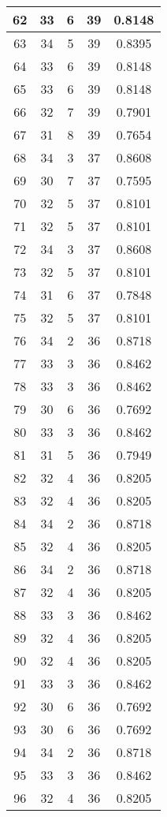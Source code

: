 \documentclass[letterpaper, 12pt]{article}
\begin{document}
\begin{longtable}{|c|c|c|c|c|}
\hline
62 & 33 & 6 & 39 & 0.8148 \\
\hline
63 & 34 & 5 & 39 & 0.8395 \\
\hline
64 & 33 & 6 & 39 & 0.8148 \\
\hline
65 & 33 & 6 & 39 & 0.8148 \\
\hline
66 & 32 & 7 & 39 & 0.7901 \\
\hline
67 & 31 & 8 & 39 & 0.7654 \\
\hline
68 & 34 & 3 & 37 & 0.8608 \\
\hline
69 & 30 & 7 & 37 & 0.7595 \\
\hline
70 & 32 & 5 & 37 & 0.8101 \\
\hline
71 & 32 & 5 & 37 & 0.8101 \\
\hline
72 & 34 & 3 & 37 & 0.8608 \\
\hline
73 & 32 & 5 & 37 & 0.8101 \\
\hline
74 & 31 & 6 & 37 & 0.7848 \\
\hline
75 & 32 & 5 & 37 & 0.8101 \\
\hline
76 & 34 & 2 & 36 & 0.8718 \\
\hline
77 & 33 & 3 & 36 & 0.8462 \\
\hline
78 & 33 & 3 & 36 & 0.8462 \\
\hline
79 & 30 & 6 & 36 & 0.7692 \\
\hline
80 & 33 & 3 & 36 & 0.8462 \\
\hline
81 & 31 & 5 & 36 & 0.7949 \\
\hline
82 & 32 & 4 & 36 & 0.8205 \\
\hline
83 & 32 & 4 & 36 & 0.8205 \\
\hline
84 & 34 & 2 & 36 & 0.8718 \\
\hline
85 & 32 & 4 & 36 & 0.8205 \\
\hline
86 & 34 & 2 & 36 & 0.8718 \\
\hline
87 & 32 & 4 & 36 & 0.8205 \\
\hline
88 & 33 & 3 & 36 & 0.8462 \\
\hline
89 & 32 & 4 & 36 & 0.8205 \\
\hline
90 & 32 & 4 & 36 & 0.8205 \\
\hline
91 & 33 & 3 & 36 & 0.8462 \\
\hline
92 & 30 & 6 & 36 & 0.7692 \\
\hline
93 & 30 & 6 & 36 & 0.7692 \\
\hline
94 & 34 & 2 & 36 & 0.8718 \\
\hline
95 & 33 & 3 & 36 & 0.8462 \\
\hline
96 & 32 & 4 & 36 & 0.8205 \\

\end{longtable}
\end{document}
